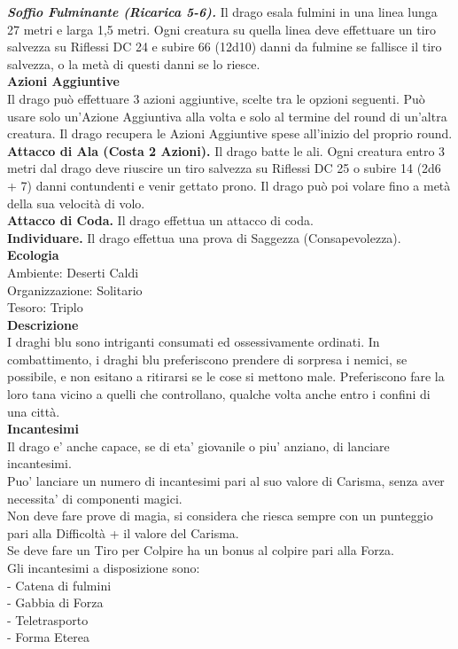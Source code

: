 \begin{multicols}{2}
\emph{\textbf{Soffio Fulminante (Ricarica 5-6).}} Il drago esala fulmini in una linea lunga 27 metri e larga 1,5 metri. Ogni creatura su quella linea deve effettuare un tiro salvezza su Riflessi DC  24 e subire 66 (12d10) danni da fulmine se fallisce il tiro salvezza, o la metà di questi danni se lo riesce.\\
\textbf{Azioni Aggiuntive}\\
Il drago può effettuare 3 azioni aggiuntive, scelte tra le opzioni seguenti. Può usare solo un'Azione Aggiuntiva alla volta e solo al termine del round di un'altra creatura. Il drago recupera le Azioni Aggiuntive spese all'inizio del proprio round.\\
\textbf{Attacco di Ala (Costa 2 Azioni).} Il drago batte le ali. Ogni creatura entro 3 metri dal drago deve riuscire un tiro salvezza su Riflessi DC  25 o subire 14 (2d6 + 7) danni contundenti e venir gettato prono. Il drago può poi volare fino a metà della sua velocità di volo.\\
\textbf{Attacco di Coda.} Il drago effettua un attacco di coda.\\
\textbf{Individuare.} Il drago effettua una prova di Saggezza (Consapevolezza).\\
\textbf{Ecologia}\\
Ambiente: Deserti Caldi\\
Organizzazione: Solitario\\
Tesoro: Triplo\\
\textbf{Descrizione}\\
I draghi blu sono intriganti consumati ed ossessivamente ordinati. In combattimento, i draghi blu preferiscono prendere di sorpresa i nemici, se possibile, e non esitano a ritirarsi se le cose si mettono male. Preferiscono fare la loro tana vicino a quelli che controllano, qualche volta anche entro i confini di una città.\\
\textbf{Incantesimi}\\
Il drago e' anche capace, se di eta' giovanile o piu' anziano, di lanciare incantesimi.\\
Puo' lanciare un numero di incantesimi pari al suo valore di Carisma, senza aver necessita' di componenti magici.\\
Non deve fare prove di magia, si considera che riesca sempre con un punteggio pari alla Difficoltà + il valore del Carisma.\\
Se deve fare un Tiro per Colpire ha un bonus al colpire pari alla Forza.\\
Gli incantesimi a disposizione sono:\\
- Catena di fulmini\\
- Gabbia di Forza\\
- Teletrasporto\\
- Forma Eterea\\


\end{multicols}
